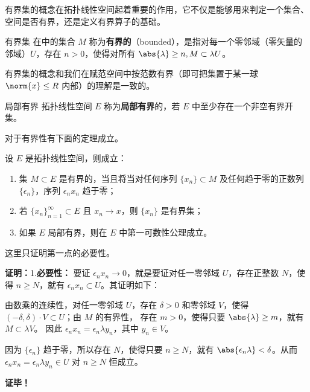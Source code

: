 
有界集的概念在拓扑线性空间起着重要的作用，它不仅是能够用来判定一个集合、空间是否有界，还是定义有界算子的基础。

\begin{definition}{有界集}
在中的集合 $M$ 称为\textbf{有界的}（bounded），是指对每一个零邻域（零矢量的邻域）$U$，存在 $n>0$，使得对所有 $\abs{\lambda}\geq n,M\subset \lambda U$。 
\end{definition}
有界集的概念和我们在赋范空间中按范数有界（即可把集置于某一球 $\norm{x}\leq R$ 内部）的理解是一致的。

\begin{definition}{局部有界}
拓扑线性空间 $E$ 称为\textbf{局部有界}的，若 $E$ 中至少存在一个非空有界开集。
\end{definition}

对于有界性有下面的定理成立。
\begin{theorem}{}
设 $E$ 是拓扑线性空间，则成立：
\begin{enumerate}
\item 集 $M\subset E$ 是有界的，当且将当对任何序列 $\{x_n\}\subset M$ 及任何趋于零的正数列 $\{\epsilon_n\}$，序列 $\epsilon_n x_n$ 趋于零；
\item 若 $\{x_n\}_{n=1}^\infty\subset E$ 且 $x_n\rightarrow x$，则 $\{x_n\}$ 是有界集；
\item 如果 $E$ 局部有界，则在 $E$ 中第一可数性公理成立。 
\end{enumerate}

\end{theorem}
这里只证明第一点的必要性。

\textbf{证明：}1.\textbf{必要性：} 要证 $\epsilon_n x_n\rightarrow0$，就是要证对任一零邻域 $U$，存在正整数 $N$，使得 $n\geq N$，就有 $\epsilon_n x_n\subset U$。其证明如下：

由数乘的连续性，对任一零邻域 $U$，存在 $\delta>0$ 和零邻域 $V$，使得 $(-\delta,\delta)\cdot V\subset U$；由 $M$ 的有界性， 存在 $m>0$，使得只要 $\abs{\lambda}\geq m$，就有 $M\subset\lambda V$。 因此 $\epsilon_nx_n=\epsilon_n \lambda y_n$，其中 $y_n\in V$。

因为 $\{\epsilon_n\}$ 趋于零，所以存在 $N$，使得只要 $n\geq N$，就有 $\abs{\epsilon_n\lambda}<\delta$。从而 $\epsilon_nx_n=\epsilon_n \lambda y_n\in U$ 对 $n\geq N$ 恒成立。




\textbf{证毕！}











